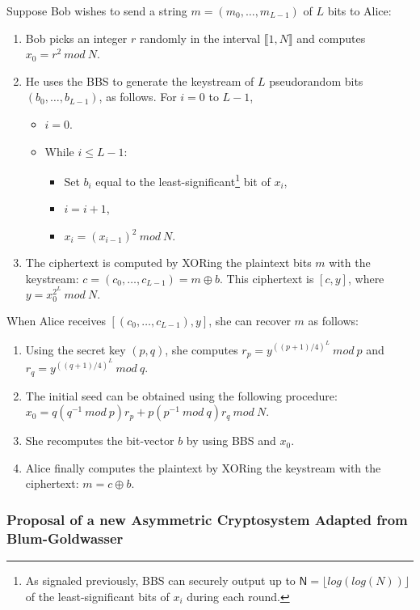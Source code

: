 \documentclass{article}
\begin{document}
Suppose Bob wishes to send a string $m=(m_0, \dots, m_{L-1})$ of $L$ bits to Alice:
\begin{enumerate}
\item Bob picks an integer $r$ randomly in the interval $\llbracket 1,N\rrbracket$ and computes $x_0 = r^2~mod~N$.
\item He uses the BBS to generate the keystream of $L$ pseudorandom bits $(b_0, \dots, b_{L-1})$, as follows. For $i=0$ to $L-1$,
\begin{itemize}
\item $i=0$.
\item While $i \leqslant L-1$:
\begin{itemize}
\item Set $b_i$ equal to the least-significant\footnote{As signaled previously, BBS can securely output up to $\mathsf{N} = \lfloor log(log(N)) \rfloor$ of the least-significant bits of $x_i$ during each round.} bit of $x_i$,
\item $i=i+1$,
\item $x_i = (x_{i-1})^2~mod~N.$
\end{itemize}
\end{itemize}
\item The ciphertext is computed by XORing the plaintext bits $m$ with the keystream: $ c = (c_0, \dots, c_{L-1}) = m \oplus  b$. This ciphertext is $[c, y]$, where $y=x_{0}^{2^{L}}~mod~N.$
\end{enumerate}


When Alice receives $\left[(c_0, \dots, c_{L-1}), y\right]$, she can recover $m$ as follows:
\begin{enumerate}
\item Using the secret key $(p,q)$, she computes $r_p = y^{((p+1)/4)^{L}}~mod~p$ and $r_q = y^{((q+1)/4)^{L}}~mod~q$.
\item The initial seed can be obtained using the following procedure: $x_0=q(q^{-1}~{mod}~p)r_p + p(p^{-1}~{mod}~q)r_q~{mod}~N$.
\item She recomputes the bit-vector $b$ by using BBS and $x_0$.
\item Alice finally computes the plaintext by XORing the keystream with the ciphertext: $ m = c \oplus  b$.
\end{enumerate}


\subsubsection{Proposal of a new Asymmetric Cryptosystem Adapted from Blum-Goldwasser}
\end{document}
